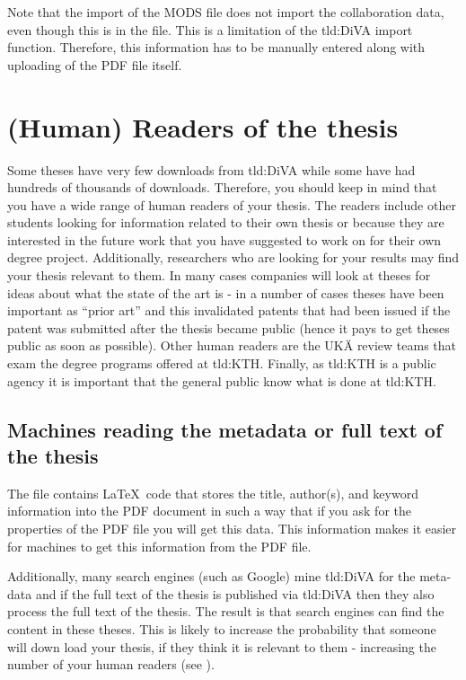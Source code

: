 Note that the import of the MODS file does not import the collaboration data, even though this is in the file. This is a limitation of the \gls{tld:DiVA} import function. Therefore, this information has to be manually entered along with uploading of the PDF file itself.

\section{(Human) Readers of the thesis}
\label{sec:readers}
Some theses have very few downloads from \gls{tld:DiVA} while some have had hundreds of thousands of downloads. Therefore, you should keep in mind that you have a wide range of human readers of your thesis. The readers include other students looking for information related to their own thesis or because they are interested in the future work that you have suggested to work on for their own degree project. Additionally, researchers who are looking for your results may find your thesis relevant to them. In many cases companies will look at theses for ideas about what the state of the art is - in a number of cases theses have been important as ``prior art'' and this invalidated patents that had been issued if the patent was submitted after the thesis became public (hence it pays to get theses public as soon as possible). Other human readers are the UKÄ review teams that exam the degree programs offered at \gls{tld:KTH}. Finally, as \gls{tld:KTH} is a public agency it is important that the general public know what is done at \gls{tld:KTH}.

\subsection{Machines reading the metadata or full text of the thesis}
\label{sec:searchEngines}
The file  contains \LaTeX\ code that stores the title, author(s), and keyword information into the PDF document in such a way that if you ask for the properties of the PDF file you will get this data. This information makes it easier for machines to get this information from the PDF file. 

Additionally, many search engines (such as Google) mine \gls{tld:DiVA} for the meta-data and if the full text of the thesis is published via \gls{tld:DiVA} then they also process the full text of the thesis. The result is that search engines can find the content in these theses.  This is likely to increase the probability that someone will down load your thesis, if they think it is relevant to them - increasing the number of your human readers (see ).

